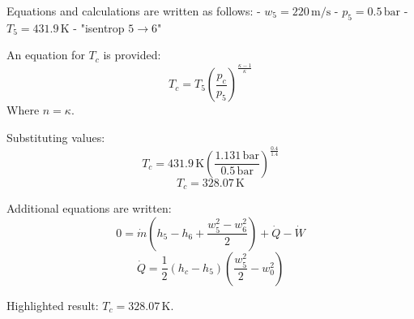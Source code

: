Equations and calculations are written as follows:  
- \( w_5 = 220 \, \text{m/s} \)  
- \( p_5 = 0.5 \, \text{bar} \)  
- \( T_5 = 431.9 \, \text{K} \)  
- "isentrop \( 5 \rightarrow 6 \)"  

An equation for \( T_c \) is provided:  
\[ T_c = T_5 \left( \frac{p_c}{p_5} \right)^{\frac{\kappa - 1}{\kappa}} \]  
Where \( n = \kappa \).  

Substituting values:  
\[ T_c = 431.9 \, \text{K} \left( \frac{1.131 \, \text{bar}}{0.5 \, \text{bar}} \right)^{\frac{0.4}{1.4}} \]  
\[ T_c = 328.07 \, \text{K} \]  

Additional equations are written:  
\[ 0 = \dot{m} \left( h_5 - h_6 + \frac{w_5^2 - w_6^2}{2} \right) + \dot{Q} - \dot{W} \]  
\[ \dot{Q} = \frac{1}{2} \left( h_c - h_5 \right) \left( \frac{w_5^2}{2} - w_0^2 \right) \]  

Highlighted result:  
\( T_c = 328.07 \, \text{K} \).